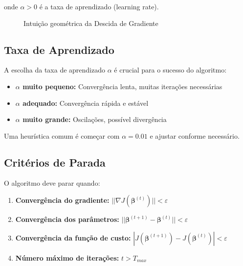 \documentclass[a4paper,12pt]{article}
\begin{document}
onde $\alpha > 0$ é a taxa de aprendizado (learning rate).

\begin{figure}[H]
    \centering
            \caption{Intuição geométrica da Descida de Gradiente}
\end{figure}

\subsection{Taxa de Aprendizado}

A escolha da taxa de aprendizado $\alpha$ é crucial para o sucesso do algoritmo:

\begin{itemize}
    \item \textbf{$\alpha$ muito pequeno:} Convergência lenta, muitas iterações necessárias
    \item \textbf{$\alpha$ adequado:} Convergência rápida e estável
    \item \textbf{$\alpha$ muito grande:} Oscilações, possível divergência
\end{itemize}

Uma heurística comum é começar com $\alpha = 0.01$ e ajustar conforme necessário.

\subsection{Critérios de Parada}

O algoritmo deve parar quando:
\begin{enumerate}
    \item \textbf{Convergência do gradiente:} $||\nabla J(\boldsymbol{\beta}^{(t)})|| < \varepsilon$
    \item \textbf{Convergência dos parâmetros:} $||\boldsymbol{\beta}^{(t+1)} - \boldsymbol{\beta}^{(t)}|| < \varepsilon$
    \item \textbf{Convergência da função de custo:} $|J(\boldsymbol{\beta}^{(t+1)}) - J(\boldsymbol{\beta}^{(t)})| < \varepsilon$
    \item \textbf{Número máximo de iterações:} $t > T_{max}$
\end{enumerate}
\end{document}
